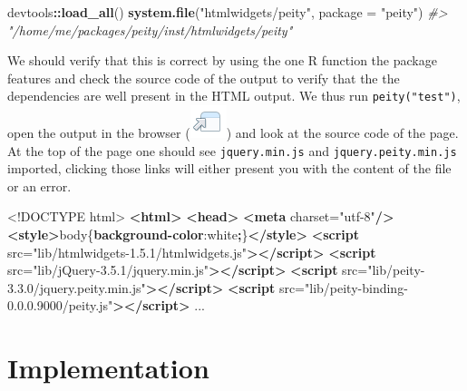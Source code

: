 \documentclass[
]{krantz}
\makeatletter
\newenvironment{Shaded}{\begin{snugshade}}{\end{snugshade}}
\newcommand{\CommentTok}[1]{\textcolor[rgb]{0.37,0.37,0.37}{\textit{#1}}}
\newcommand{\ConstantTok}[1]{\textcolor[rgb]{0,0,0}{#1}}
\newcommand{\DataTypeTok}[1]{\textcolor[rgb]{0.27,0.27,0.27}{#1}}
\newcommand{\KeywordTok}[1]{\textcolor[rgb]{0.27,0.27,0.27}{\textbf{#1}}}
\newcommand{\NormalTok}[1]{#1}
\newcommand{\OperatorTok}[1]{\textcolor[rgb]{0.43,0.43,0.43}{\textbf{#1}}}
\newcommand{\OtherTok}[1]{\textcolor[rgb]{0.37,0.37,0.37}{#1}}
\newcommand{\StringTok}[1]{\textcolor[rgb]{0.5,0.5,0.5}{#1}}
\newenvironment{kframe}{%
\medskip{}
\setlength{\fboxsep}{.8em}
 \def\at@end@of@kframe{}%
 \ifinner\ifhmode%
  \def\at@end@of@kframe{\end{minipage}}%
  \begin{minipage}{\columnwidth}%
 \fi\fi%
 \def\FrameCommand##1{\hskip\@totalleftmargin \hskip-\fboxsep
 \colorbox{shadecolor}{##1}\hskip-\fboxsep
     \hskip-\linewidth \hskip-\@totalleftmargin \hskip\columnwidth}%
 \MakeFramed {\advance\hsize-\width
   \@totalleftmargin\z@ \linewidth\hsize
   \@setminipage}}%
 {\par\unskip\endMakeFramed%
 \at@end@of@kframe}
\renewenvironment{Shaded}{\begin{kframe}}{\end{kframe}}
\makeatother
\begin{document}
\begin{Shaded}
\begin{Highlighting}[]
\NormalTok{devtools}\OperatorTok{::}\KeywordTok{load\_all}\NormalTok{()}
\KeywordTok{system.file}\NormalTok{(}\StringTok{"htmlwidgets/peity"}\NormalTok{, }\DataTypeTok{package =} \StringTok{"peity"}\NormalTok{)                                         }
\CommentTok{\#> "/home/me/packages/peity/inst/htmlwidgets/peity"}
\end{Highlighting}
\end{Shaded}

We should verify that this is correct by using the one R function the package features and check the source code of the output to verify that the the dependencies are well present in the HTML output. We thus run \texttt{peity("test")}, open the output in the browser (\includegraphics{images/open-in-browser.png}) and look at the source code of the page. At the top of the page one should see \texttt{jquery.min.js} and \texttt{jquery.peity.min.js} imported, clicking those links will either present you with the content of the file or an error.

\begin{Shaded}
\begin{Highlighting}[]
\DataTypeTok{<!DOCTYPE }\NormalTok{html}\DataTypeTok{>}
\KeywordTok{<html>}
\KeywordTok{<head>}
\KeywordTok{<meta}\OtherTok{ charset=}\StringTok{"utf{-}8"}\KeywordTok{/>}
\KeywordTok{<style>}\NormalTok{body\{}\KeywordTok{background{-}color}\NormalTok{:}\ConstantTok{white}\OperatorTok{;}\NormalTok{\}}\KeywordTok{</style>}
\KeywordTok{<script}\OtherTok{ src=}\StringTok{"lib/htmlwidgets{-}1.5.1/htmlwidgets.js"}\KeywordTok{></script>}
\KeywordTok{<script}\OtherTok{ src=}\StringTok{"lib/jQuery{-}3.5.1/jquery.min.js"}\KeywordTok{></script>}
\KeywordTok{<script}\OtherTok{ src=}\StringTok{"lib/peity{-}3.3.0/jquery.peity.min.js"}\KeywordTok{></script>}
\KeywordTok{<script}\OtherTok{ src=}\StringTok{"lib/peity{-}binding{-}0.0.0.9000/peity.js"}\KeywordTok{></script>}
\NormalTok{...}
\end{Highlighting}
\end{Shaded}

\hypertarget{widgets-realistic-implementation}{%
\section{Implementation}\label{widgets-realistic-implementation}}
\end{document}
